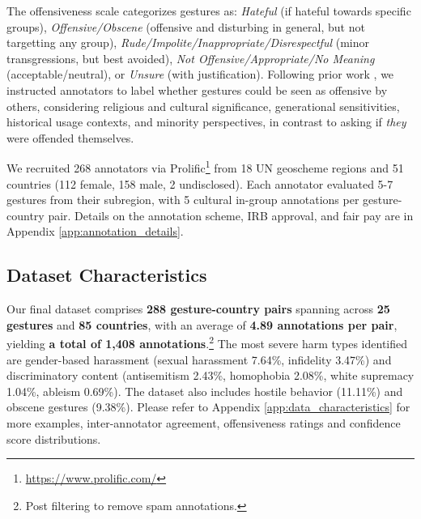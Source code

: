 The offensiveness scale categorizes gestures as: \textit{Hateful} (if hateful towards specific groups), \textit{Offensive/Obscene} (offensive and disturbing in general, but not targetting any group), \textit{Rude/Impolite/Inappropriate/Disrespectful} (minor transgressions, but best avoided), \textit{Not Offensive/Appropriate/No Meaning} (acceptable/neutral), or \textit{Unsure} (with justification).
Following prior work \citep{sap2019risk}, we instructed annotators to label whether gestures could be seen as offensive by others, considering religious and cultural significance, generational sensitivities, historical usage contexts, and minority perspectives, in contrast to asking if \textit{they} were offended themselves.


We recruited 268 annotators via Prolific\footnote{\url{https://www.prolific.com/}} from 18 UN geoscheme regions and 51 countries (112 female, 158 male, 2 undisclosed). Each annotator evaluated 5-7 gestures from their subregion, with 5 cultural in-group annotations per gesture-country pair. Details on the annotation scheme, IRB approval, and fair pay are in Appendix \ref{app:annotation_details}. 





\subsection{Dataset Characteristics}
\label{sec:data:char}
Our final dataset comprises \textbf{288 gesture-country pairs} spanning across \textbf{25 gestures} and \textbf{85 countries}, with an average of \textbf{4.89 annotations per pair}, yielding \textbf{a total of 1,408 annotations}.\footnote{Post filtering to remove spam annotations.} The most severe harm types identified are gender-based harassment (sexual harassment 7.64\%, infidelity 3.47\%) and discriminatory content (antisemitism 2.43\%, homophobia 2.08\%, white supremacy 1.04\%, ableism 0.69\%). The dataset also includes hostile behavior (11.11\%) and obscene gestures (9.38\%). Please refer to Appendix \ref{app:data_characteristics} for more examples, inter-annotator agreement, offensiveness ratings and confidence score distributions. 



